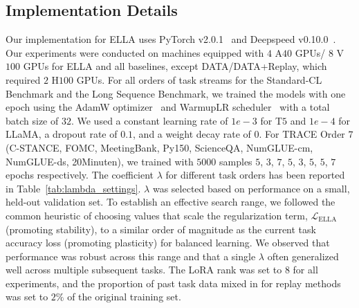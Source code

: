 \subsection{Implementation Details} 
\label{app:implementation_details}
Our implementation for ELLA uses PyTorch v2.0.1~\cite{paszke2019pytorch} and Deepspeed v0.10.0~\cite{rasley2020deepspeed}.
Our experiments were conducted on machines equipped with $4$ A$40$ GPUs/ $8$ V$100$ GPUs for ELLA and all baselines, except DATA/DATA+Replay, which required $2$ H$100$ GPUs. For all orders of task
streams for the Standard-CL Benchmark and the Long Sequence Benchmark, we trained the models with one epoch using the AdamW optimizer~\cite{loshchilov2017decoupled} and WarmupLR scheduler~\cite{deepspeed_schedulers} with a total batch size of $32$. We used a constant learning rate of $1e-3$ for T$5$ and $1e-4$ for LLaMA, a dropout rate of
$0.1$, and a weight decay rate of $0$. For TRACE Order $7$ (C-STANCE, FOMC,
MeetingBank, Py150, ScienceQA, NumGLUE-cm,
NumGLUE-ds, 20Minuten), we trained with $5000$
samples $5$, $3$, $7$, $5$, $3$, $5$, $5$, $7$ epochs respectively. The coefficient $\lambda$ for different task orders has been reported in Table~\ref{tab:lambda_settings}. $\lambda$ was selected based on performance on a small, held-out validation set. To establish an effective search range, we followed the common heuristic of choosing values that scale the regularization term, $\mathcal{L}_{\text{ELLA}}$ (promoting stability), to a similar order of magnitude as the current task accuracy loss (promoting plasticity) for balanced learning. We observed that performance was robust across this range and that a single $\lambda$ often generalized well across multiple subsequent tasks. The LoRA
rank was set to $8$ for all experiments, and the proportion of past task data mixed in for replay methods was set to $2\%$ of the original training set. 


